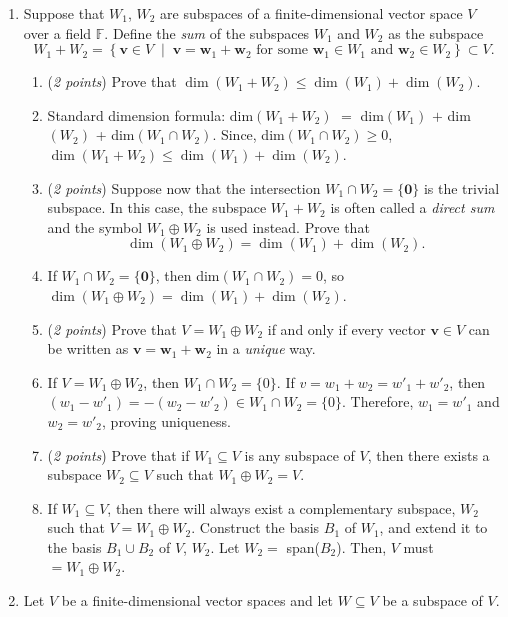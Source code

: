 \documentclass[11pt]{article}
\theoremstyle{definition}
\numberwithin{equation}{subsection}
\begin{document}
\begin{enumerate}
\item Suppose that $W_1$, $W_2$ are subspaces of a finite-dimensional vector space $V$ over a field $\mathbb{F}$. Define the \emph{sum} of the subspaces $W_1$ and $W_2$ as the subspace
$$W_1+W_2=\left\{\mathbf{v}\in V \;\;|\;\; \text{$\mathbf{v}=\mathbf{w}_1+\mathbf{w}_2$ for some $\mathbf{w}_1\in W_1$ and $\mathbf{w}_2\in W_2$}\right\}\subset V.$$

\begin{enumerate}

\item[(a)] (\emph{2 points}) Prove that $\dim(W_1+W_2)\leq \dim(W_1)+\dim(W_2)$.
\item[] Standard dimension formula: dim$(W_1+W_2)$ $=$ dim$(W_1)$ $+$ dim$(W_2)$ + dim$(W_1\cap W_2)$. Since, dim$(W_1\cap W_2)\geq0$, $\dim(W_1+W_2)\leq \dim(W_1)+\dim(W_2)$.

\item[(b)] (\emph{2 points}) Suppose now that the intersection $W_1\cap W_2=\{\mathbf{0}\}$ is the trivial subspace. In this case, the subspace $W_1+W_2$ is often called a \emph{direct sum} and the symbol $W_1\oplus W_2$ is used instead. Prove that
$$\dim(W_1\oplus W_2)=\dim(W_1)+\dim(W_2).$$
\item[] If $W_1\cap W_2=\{\mathbf{0}\}$, then dim$(W_1\cap W_2)=0$, so $\dim(W_1\oplus W_2)=\dim(W_1)+\dim(W_2).$

\item[(c)] (\emph{2 points}) Prove that $V=W_1\oplus W_2$ if and only if every vector $\mathbf{v}\in V$ can be written as $\mathbf{v}=\mathbf{w}_1+\mathbf{w}_2$ in a \emph{unique} way. 
\item[] If $V=W_1\oplus W_2$, then $W_1\cap W_2=\{0\}$. If $v=w_1+w_2=w'_1+w'_2$, then $(w_1-w'_1)=-(w_2-w'_2)\in W_1\cap W_2=\{0\}$. Therefore, $w_1=w'_1$ and $w_2=w'_2$, proving uniqueness.

\item[(d)] (\emph{2 points}) Prove that if $W_1\subseteq V$ is any subspace of $V$, then there exists a subspace $W_2\subseteq V$ such that $W_1\oplus W_2=V$. 
\item[] If $W_1\subseteq V$, then there will always exist a complementary subspace, $W_2$ such that $V=W_1\oplus W_2$. Construct the basis $B_1$ of $W_1$, and extend it to the basis $B_1\cup B_2$ of $V$, $W_2$. Let $W_2=$ span($B_2$). Then, $V$ must $=W_1\oplus W_2$.

\end{enumerate}


\item Let $V$ be a finite-dimensional vector spaces and let $W\subseteq V$ be a subspace of $V$.


\end{enumerate}
\end{document}
